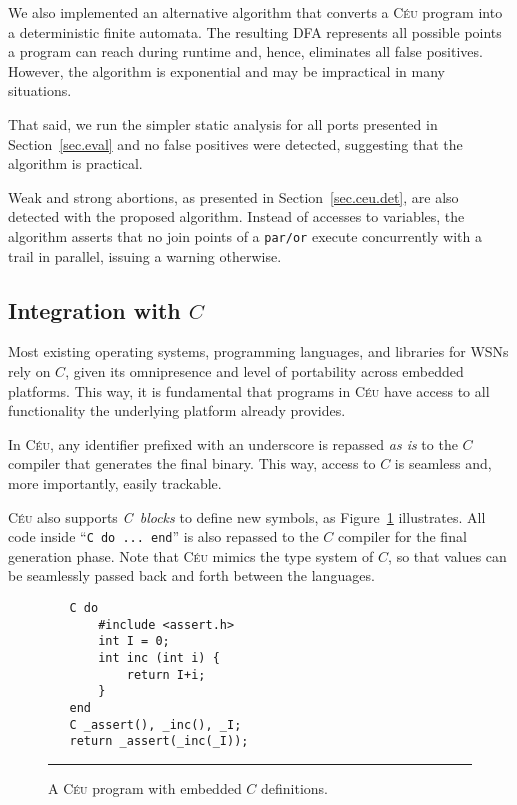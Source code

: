 \documentclass[10pt]{sensys-proc}
\newcommand{\CEU}{\textsc{C\'{e}u}\xspace}
\newcommand{\code}[1] {{\small{\texttt{#1}}}}
\begin{document}
We also implemented an alternative algorithm that converts a \CEU program into 
a deterministic finite automata.
The resulting DFA represents all possible points a program can reach during 
runtime and, hence, eliminates all false positives.
However, the algorithm is exponential and may be impractical in many 
situations.

That said, we run the simpler static analysis for all ports presented in 
Section~\ref{sec.eval} and no false positives were detected, suggesting that 
the algorithm is practical.

Weak and strong abortions, as presented in Section~\ref{sec.ceu.det}, are also 
detected with the proposed algorithm.
Instead of accesses to variables, the algorithm asserts that no join points of 
a \code{par/or} execute concurrently with a trail in parallel, issuing a 
warning otherwise.


\subsection{Integration with $C$}
\label{sec.ceu.c}

Most existing operating systems, programming languages, and libraries for WSNs 
rely on $C$, given its omnipresence and level of portability across embedded 
platforms.
This way, it is fundamental that programs in \CEU have access to all 
functionality the underlying platform already provides.

In \CEU, any identifier prefixed with an underscore is repassed \emph{as is} to 
the $C$ compiler that generates the final binary.
This way, access to $C$ is seamless and, more importantly, easily trackable.


\CEU also supports \emph{C~blocks} to define new symbols, as Figure~\ref{lst.c} 
illustrates.
All code inside ``\code{C do ... end}'' is also repassed to the $C$ compiler 
for the final generation phase.
Note that \CEU{} mimics the type system of $C$, so that values can be 
seamlessly passed back and forth between the languages.

\begin{figure}[t]
{\small
\begin{verbatim}
   C do
       #include <assert.h>
       int I = 0;
       int inc (int i) {
           return I+i;
       }
   end
   C _assert(), _inc(), _I;
   return _assert(_inc(_I));
\end{verbatim}
}
\rule{8.5cm}{0.37pt}
\caption{ A \CEU program with embedded $C$ definitions.
\label{lst.c}
}
\end{figure}
\end{document}
